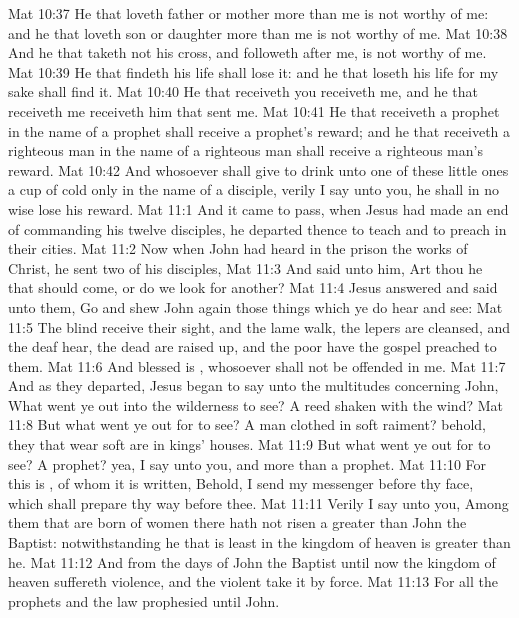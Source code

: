 \vs Mat 10:37 He that loveth father or mother more than me is not worthy of me: and he that loveth son or daughter more than me is not worthy of me.
\vs Mat 10:38 And he that taketh not his cross, and followeth after me, is not worthy of me.
\vs Mat 10:39 He that findeth his life shall lose it: and he that loseth his life for my sake shall find it.
\vs Mat 10:40 He that receiveth you receiveth me, and he that receiveth me receiveth him that sent me.
\vs Mat 10:41 He that receiveth a prophet in the name of a prophet shall receive a prophet's reward; and he that receiveth a righteous man in the name of a righteous man shall receive a righteous man's reward.
\vs Mat 10:42 And whosoever shall give to drink unto one of these little ones a cup of cold  only in the name of a disciple, verily I say unto you, he shall in no wise lose his reward.
\vs Mat 11:1 And it came to pass, when Jesus had made an end of commanding his twelve disciples, he departed thence to teach and to preach in their cities.
\vs Mat 11:2 Now when John had heard in the prison the works of Christ, he sent two of his disciples,
\vs Mat 11:3 And said unto him, Art thou he that should come, or do we look for another?
\vs Mat 11:4 Jesus answered and said unto them, Go and shew John again those things which ye do hear and see:
\vs Mat 11:5 The blind receive their sight, and the lame walk, the lepers are cleansed, and the deaf hear, the dead are raised up, and the poor have the gospel preached to them.
\vs Mat 11:6 And blessed is , whosoever shall not be offended in me.
\vs Mat 11:7 And as they departed, Jesus began to say unto the multitudes concerning John, What went ye out into the wilderness to see? A reed shaken with the wind?
\vs Mat 11:8 But what went ye out for to see? A man clothed in soft raiment? behold, they that wear soft  are in kings' houses.
\vs Mat 11:9 But what went ye out for to see? A prophet? yea, I say unto you, and more than a prophet.
\vs Mat 11:10 For this is , of whom it is written, Behold, I send my messenger before thy face, which shall prepare thy way before thee.
\vs Mat 11:11 Verily I say unto you, Among them that are born of women there hath not risen a greater than John the Baptist: notwithstanding he that is least in the kingdom of heaven is greater than he.
\vs Mat 11:12 And from the days of John the Baptist until now the kingdom of heaven suffereth violence, and the violent take it by force.
\vs Mat 11:13 For all the prophets and the law prophesied until John.
